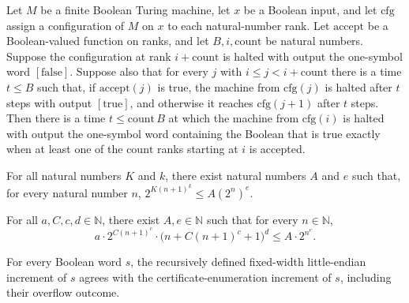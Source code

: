 \begin{lemma}
\label{Complexity.enumLoop_run}
\leanok
{}
Let $M$ be a finite Boolean Turing machine, let $x$ be a Boolean input, and let
$\mathrm{cfg}$ assign a configuration of $M$ on $x$ to each natural-number rank. Let
$\mathrm{accept}$ be a Boolean-valued function on ranks, and let $B,i,\mathrm{count}$ be
natural numbers. Suppose the configuration at rank $i+\mathrm{count}$ is halted with
output the one-symbol word $[\mathrm{false}]$. Suppose also that for every $j$ with
$i\le j<i+\mathrm{count}$ there is a time $t\le B$ such that, if $\mathrm{accept}(j)$ is
true, the machine from $\mathrm{cfg}(j)$ is halted after $t$ steps with output
$[\mathrm{true}]$, and otherwise it reaches $\mathrm{cfg}(j+1)$ after $t$ steps. Then
there is a time $t\le \mathrm{count}\,B$ at which the machine from $\mathrm{cfg}(i)$ is
halted with output the one-symbol word containing the Boolean that is true exactly when
at least one of the $\mathrm{count}$ ranks starting at $i$ is accepted.
\end{lemma}

\begin{lemma}
\label{Complexity.enumExponent_bound}
\leanok
{}
For all natural numbers $K$ and $k$, there exist natural numbers $A$ and $e$ such that,
for every natural number $n$, $2^{K(n+1)^k}\le A(2^n)^e$.
\end{lemma}

\begin{lemma}
\label{Complexity.enumBudget_bound}
\leanok
{}
For all $a,C,c,d\in\mathbb{N}$, there exist $A,e\in\mathbb{N}$ such that for every
$n\in\mathbb{N}$,
\[a\cdot 2^{C(n+1)^c}\cdot\bigl(n+C(n+1)^c+1\bigr)^d\le A\cdot 2^{n^e}.\]
\end{lemma}

\begin{lemma}
\label{Complexity.enumCont_inc_eq}
\leanok
{}
For every Boolean word $s$, the recursively defined fixed-width little-endian increment
of $s$ agrees with the certificate-enumeration increment of $s$, including their
overflow outcome.
\end{lemma}

